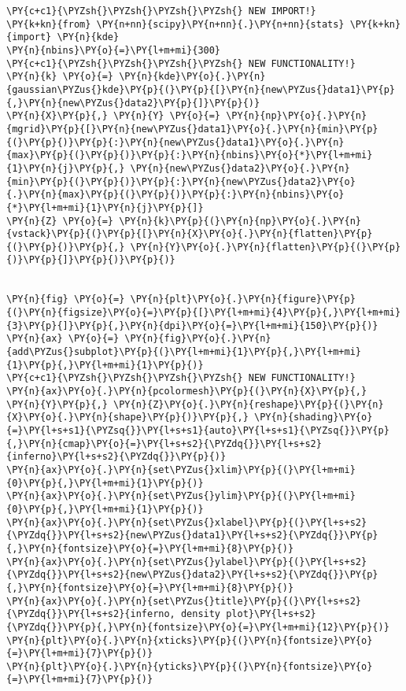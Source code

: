     \begin{tcolorbox}[breakable, size=fbox, boxrule=1pt, pad at break*=1mm,colback=cellbackground, colframe=cellborder]
\begin{Verbatim}[commandchars=\\\{\}]
\PY{c+c1}{\PYZsh{}\PYZsh{}\PYZsh{}\PYZsh{} NEW IMPORT!}
\PY{k+kn}{from} \PY{n+nn}{scipy}\PY{n+nn}{.}\PY{n+nn}{stats} \PY{k+kn}{import} \PY{n}{kde}
\PY{n}{nbins}\PY{o}{=}\PY{l+m+mi}{300}
\PY{c+c1}{\PYZsh{}\PYZsh{}\PYZsh{}\PYZsh{} NEW FUNCTIONALITY!}
\PY{n}{k} \PY{o}{=} \PY{n}{kde}\PY{o}{.}\PY{n}{gaussian\PYZus{}kde}\PY{p}{(}\PY{p}{[}\PY{n}{new\PYZus{}data1}\PY{p}{,}\PY{n}{new\PYZus{}data2}\PY{p}{]}\PY{p}{)}
\PY{n}{X}\PY{p}{,} \PY{n}{Y} \PY{o}{=} \PY{n}{np}\PY{o}{.}\PY{n}{mgrid}\PY{p}{[}\PY{n}{new\PYZus{}data1}\PY{o}{.}\PY{n}{min}\PY{p}{(}\PY{p}{)}\PY{p}{:}\PY{n}{new\PYZus{}data1}\PY{o}{.}\PY{n}{max}\PY{p}{(}\PY{p}{)}\PY{p}{:}\PY{n}{nbins}\PY{o}{*}\PY{l+m+mi}{1}\PY{n}{j}\PY{p}{,} \PY{n}{new\PYZus{}data2}\PY{o}{.}\PY{n}{min}\PY{p}{(}\PY{p}{)}\PY{p}{:}\PY{n}{new\PYZus{}data2}\PY{o}{.}\PY{n}{max}\PY{p}{(}\PY{p}{)}\PY{p}{:}\PY{n}{nbins}\PY{o}{*}\PY{l+m+mi}{1}\PY{n}{j}\PY{p}{]}
\PY{n}{Z} \PY{o}{=} \PY{n}{k}\PY{p}{(}\PY{n}{np}\PY{o}{.}\PY{n}{vstack}\PY{p}{(}\PY{p}{[}\PY{n}{X}\PY{o}{.}\PY{n}{flatten}\PY{p}{(}\PY{p}{)}\PY{p}{,} \PY{n}{Y}\PY{o}{.}\PY{n}{flatten}\PY{p}{(}\PY{p}{)}\PY{p}{]}\PY{p}{)}\PY{p}{)}


\PY{n}{fig} \PY{o}{=} \PY{n}{plt}\PY{o}{.}\PY{n}{figure}\PY{p}{(}\PY{n}{figsize}\PY{o}{=}\PY{p}{[}\PY{l+m+mi}{4}\PY{p}{,}\PY{l+m+mi}{3}\PY{p}{]}\PY{p}{,}\PY{n}{dpi}\PY{o}{=}\PY{l+m+mi}{150}\PY{p}{)} 
\PY{n}{ax} \PY{o}{=} \PY{n}{fig}\PY{o}{.}\PY{n}{add\PYZus{}subplot}\PY{p}{(}\PY{l+m+mi}{1}\PY{p}{,}\PY{l+m+mi}{1}\PY{p}{,}\PY{l+m+mi}{1}\PY{p}{)}
\PY{c+c1}{\PYZsh{}\PYZsh{}\PYZsh{}\PYZsh{} NEW FUNCTIONALITY!}
\PY{n}{ax}\PY{o}{.}\PY{n}{pcolormesh}\PY{p}{(}\PY{n}{X}\PY{p}{,} \PY{n}{Y}\PY{p}{,} \PY{n}{Z}\PY{o}{.}\PY{n}{reshape}\PY{p}{(}\PY{n}{X}\PY{o}{.}\PY{n}{shape}\PY{p}{)}\PY{p}{,} \PY{n}{shading}\PY{o}{=}\PY{l+s+s1}{\PYZsq{}}\PY{l+s+s1}{auto}\PY{l+s+s1}{\PYZsq{}}\PY{p}{,}\PY{n}{cmap}\PY{o}{=}\PY{l+s+s2}{\PYZdq{}}\PY{l+s+s2}{inferno}\PY{l+s+s2}{\PYZdq{}}\PY{p}{)}
\PY{n}{ax}\PY{o}{.}\PY{n}{set\PYZus{}xlim}\PY{p}{(}\PY{l+m+mi}{0}\PY{p}{,}\PY{l+m+mi}{1}\PY{p}{)}
\PY{n}{ax}\PY{o}{.}\PY{n}{set\PYZus{}ylim}\PY{p}{(}\PY{l+m+mi}{0}\PY{p}{,}\PY{l+m+mi}{1}\PY{p}{)}
\PY{n}{ax}\PY{o}{.}\PY{n}{set\PYZus{}xlabel}\PY{p}{(}\PY{l+s+s2}{\PYZdq{}}\PY{l+s+s2}{new\PYZus{}data1}\PY{l+s+s2}{\PYZdq{}}\PY{p}{,}\PY{n}{fontsize}\PY{o}{=}\PY{l+m+mi}{8}\PY{p}{)}
\PY{n}{ax}\PY{o}{.}\PY{n}{set\PYZus{}ylabel}\PY{p}{(}\PY{l+s+s2}{\PYZdq{}}\PY{l+s+s2}{new\PYZus{}data2}\PY{l+s+s2}{\PYZdq{}}\PY{p}{,}\PY{n}{fontsize}\PY{o}{=}\PY{l+m+mi}{8}\PY{p}{)}
\PY{n}{ax}\PY{o}{.}\PY{n}{set\PYZus{}title}\PY{p}{(}\PY{l+s+s2}{\PYZdq{}}\PY{l+s+s2}{inferno, density plot}\PY{l+s+s2}{\PYZdq{}}\PY{p}{,}\PY{n}{fontsize}\PY{o}{=}\PY{l+m+mi}{12}\PY{p}{)}
\PY{n}{plt}\PY{o}{.}\PY{n}{xticks}\PY{p}{(}\PY{n}{fontsize}\PY{o}{=}\PY{l+m+mi}{7}\PY{p}{)}
\PY{n}{plt}\PY{o}{.}\PY{n}{yticks}\PY{p}{(}\PY{n}{fontsize}\PY{o}{=}\PY{l+m+mi}{7}\PY{p}{)}


\end{Verbatim}
\end{tcolorbox}
